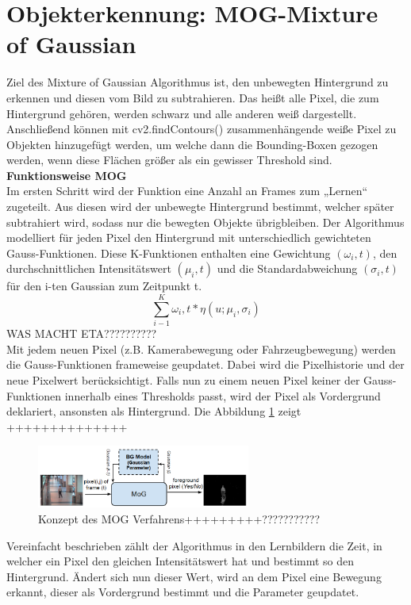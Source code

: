 \documentclass[conference]{IEEEtran}
\begin{document}
	\section{Objekterkennung: MOG-Mixture of Gaussian}
	Ziel des Mixture of Gaussian Algorithmus ist, den unbewegten Hintergrund zu erkennen und diesen vom Bild zu subtrahieren. Das heißt alle Pixel, die zum Hintergrund gehören, werden schwarz und alle anderen weiß dargestellt. Anschließend können mit cv2.findContours() zusammenhängende weiße Pixel zu Objekten hinzugefügt werden, um welche dann die Bounding-Boxen gezogen werden, wenn diese Flächen größer als ein gewisser Threshold sind.\\
	\textbf{Funktionsweise MOG}\\
	Im ersten Schritt wird der Funktion eine Anzahl an Frames zum „Lernen“ zugeteilt. Aus diesen wird der unbewegte Hintergrund bestimmt, welcher später subtrahiert wird, sodass nur die bewegten Objekte übrigbleiben.
	Der Algorithmus modelliert für jeden Pixel den Hintergrund mit unterschiedlich gewichteten Gauss-Funktionen.  Diese K-Funktionen enthalten eine Gewichtung $(\omega_i,t)$, den durchschnittlichen Intensitätswert $(\mu_i,t)$ und die Standardabweichung $(\sigma_i,t)$ für den i-ten Gaussian zum Zeitpunkt t.
	\[ \sum_{i-1}^{K} \omega_i,t * \eta(u; \mu_i,\sigma_i)  \]
	WAS MACHT ETA??????????\\
	Mit jedem neuen Pixel (z.B. Kamerabewegung oder Fahrzeugbewegung) werden die Gauss-Funktionen frameweise geupdatet. Dabei wird die Pixelhistorie und der neue Pixelwert berücksichtigt. Falls nun zu einem neuen Pixel keiner der Gauss-Funktionen innerhalb eines Thresholds passt, wird der Pixel als Vordergrund deklariert, ansonsten als Hintergrund. Die Abbildung \ref{mogKonzept} zeigt ++++++++++++++\\
	\begin{figure}[!h]
		\begin{center}
			\includegraphics[width=7cm]{Media/MOGKONZEPt.png}
			\caption{Konzept des MOG Verfahrens+++++++++???????????\cite{mog1}}
			\label{mogKonzept}
		\end{center}
	\end{figure}
	Vereinfacht beschrieben zählt der Algorithmus in den Lernbildern die Zeit, in welcher ein Pixel den gleichen Intensitätswert hat und bestimmt so den Hintergrund. Ändert sich nun dieser Wert, wird an dem Pixel eine Bewegung erkannt, dieser als Vordergrund bestimmt und die Parameter geupdatet.\\
\end{document}
